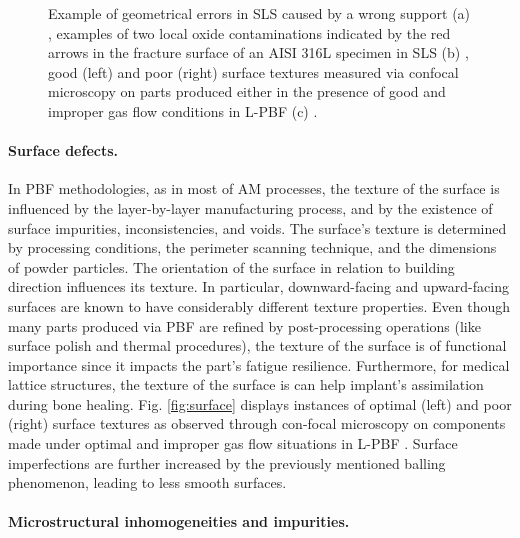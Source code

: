 \begin{figure}
{    }
    \caption[Examples of defect in PBF.]{Example of geometrical errors in SLS caused by a wrong support (a) \cite{grasso_-process_2017}, examples of two local oxide contaminations indicated by the red arrows in the fracture surface of an AISI 316L specimen in SLS (b) \cite{casati_microstructure_2016},  good (left) and poor (right) surface textures measured via confocal microscopy on parts produced either in the presence of good and improper gas flow conditions in L-PBF (c) \cite{ladewig_influence_2016}.}
\end{figure} 
\paragraph{Surface defects.} In PBF methodologies, as in most of AM processes, the texture of the surface is influenced by the layer-by-layer manufacturing process, and by the existence of surface impurities, inconsistencies, and voids. The surface's texture is determined by processing conditions, the perimeter scanning technique, and the dimensions of powder particles. The orientation of the surface in relation to building direction influences its texture. In particular, downward-facing and upward-facing surfaces are known to have considerably different texture properties. Even though many parts produced via PBF are refined by post-processing operations (like surface polish and thermal procedures), the texture of the surface is of functional importance since it impacts the part's fatigue resilience. Furthermore, for medical lattice structures, the texture of the surface is can help implant's assimilation during bone healing. Fig. \ref{fig:surface} displays instances of optimal (left) and poor (right) surface textures as observed through con-focal microscopy on components made under optimal and improper gas flow situations in L-PBF \cite{ladewig_influence_2016}. Surface imperfections are further increased by the previously mentioned balling phenomenon, leading to less smooth surfaces.
\paragraph{Microstructural inhomogeneities and impurities.}




